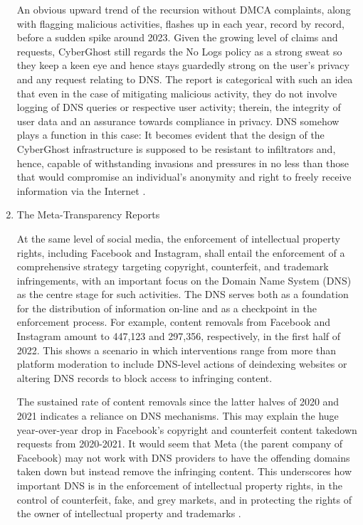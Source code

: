\begin{enumerate}
An obvious upward trend of the recursion without DMCA complaints, along with flagging malicious activities, flashes up in each year, record by record, before a sudden spike around 2023. Given the growing level of claims and requests, CyberGhost still regards the No Logs policy as a strong sweat so they keep a keen eye and hence stays guardedly strong on the user's privacy and any request relating to DNS. The report is categorical with such an idea that even in the case of mitigating malicious activity, they do not involve logging of DNS queries or respective user activity; therein, the integrity of user data and an assurance towards compliance in privacy. DNS somehow plays a function in this case: It becomes evident that the design of the CyberGhost infrastructure is supposed to be resistant to infiltrators and, hence, capable of withstanding invasions and pressures in no less than those that would compromise an individual's anonymity and right to freely receive information via the Internet \cite{CyberGhostVPN2023}.

\item The Meta-Transparency Reports

At the same level of social media, the enforcement of intellectual property rights, including Facebook and Instagram, shall entail the enforcement of a comprehensive strategy targeting copyright, counterfeit, and trademark infringements, with an important focus on the Domain Name System (DNS) as the centre stage for such activities. The DNS serves both as a foundation for the distribution of information on-line and as a checkpoint in the enforcement process. For example, content removals from Facebook and Instagram amount to 447,123 and 297,356, respectively, in the first half of 2022. This shows a scenario in which interventions range from more than platform moderation to include DNS-level actions of deindexing websites or altering DNS records to block access to infringing content.

The sustained rate of content removals since the latter halves of 2020 and 2021 indicates a reliance on DNS mechanisms. This may explain the huge year-over-year drop in Facebook's copyright and counterfeit content takedown requests from 2020-2021. It would seem that Meta (the parent company of Facebook) may not work with DNS providers to have the offending domains taken down but instead remove the infringing content. This underscores how important DNS is in the enforcement of intellectual property rights, in the control of counterfeit, fake, and grey markets, and in protecting the rights of the owner of intellectual property and trademarks \cite{Facebook2023}.


\end{enumerate}
